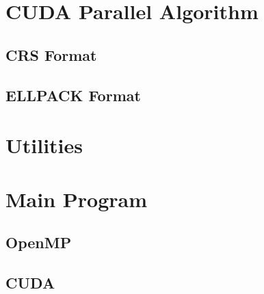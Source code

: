 \documentclass[12pt,oneside]{book} %
\begin{document}
\begin{subappendices}
    \section{CUDA Parallel Algorithm}\label{appendix:cuda}
    \subsection{CRS Format}\label{appendix:crs-cuda}
    

    \subsection{ELLPACK Format}\label{appendix:ellpack-cuda}
    

    \newpage
    \section{Utilities}\label{appendix:utilities}
    

    \newpage
    \section{Main Program}\label{appendix:main}
    \subsection{OpenMP}\label{appendix:openmp-main}
    

    \subsection{CUDA}\label{appendix:cuda-main}
    

\end{subappendices}
\end{document}
